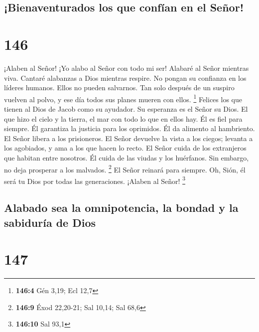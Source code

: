 \hypertarget{bienaventurados-los-que-confuxedan-en-el-seuxf1or}{%
\subsection{¡Bienaventurados los que confían en el
Señor!}\label{bienaventurados-los-que-confuxedan-en-el-seuxf1or}}

\hypertarget{section-145}{%
\section{146}\label{section-145}}

 ¡Alaben al Señor! ¡Yo alabo al Señor con todo mi ser!
 Alabaré al Señor mientras viva. Cantaré alabanzas a Dios
mientras respire.  No pongan su confianza en los líderes
humanos. Ellos no pueden salvarnos.  Tan solo después de un
suspiro vuelven al polvo, y ese día todos sus planes mueren con ellos.
\footnote{\textbf{146:4} Gén 3,19; Ecl 12,7}  Felices los
que tienen al Dios de Jacob como su ayudador. Su esperanza es el Señor
su Dios.  El que hizo el cielo y la tierra, el mar con todo
lo que en ellos hay. Él es fiel para siempre.  Él garantiza
la justicia para los oprimidos. Él da alimento al hambriento. El Señor
libera a los prisioneros.  El Señor devuelve la vista a los
ciegos; levanta a los agobiados, y ama a los que hacen lo recto.
 El Señor cuida de los extranjeros que habitan entre
nosotros. Él cuida de las viudas y los huérfanos. Sin embargo, no deja
prosperar a los malvados. \footnote{\textbf{146:9} Éxod 22,20-21; Sal
  10,14; Sal 68,6}  El Señor reinará para siempre. Oh,
Sión, él será tu Dios por todas las generaciones. ¡Alaben al Señor!
\footnote{\textbf{146:10} Sal 93,1}

\hypertarget{alabado-sea-la-omnipotencia-la-bondad-y-la-sabiduruxeda-de-dios}{%
\subsection{Alabado sea la omnipotencia, la bondad y la sabiduría de
Dios}\label{alabado-sea-la-omnipotencia-la-bondad-y-la-sabiduruxeda-de-dios}}

\hypertarget{section-146}{%
\section{147}\label{section-146}}

